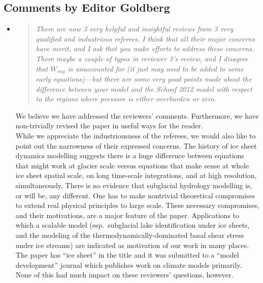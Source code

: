 \documentclass[11pt,reqno]{amsart}
\newcommand{\reply}[2]{
\medskip\medskip
\item  \begin{quote}
\emph{#1}
\end{quote}

\medskip
\noindent #2}
\begin{document}
\subsection*{Comments by Editor Goldberg}\begin{itemize}
\reply{There are now 3 very helpful and insightful reviews from 3 very qualified and industrious referees.  I think that all their major concerns have merit, and I ask that you make efforts to address these concerns.  There maybe a couple of typos in reviewer 3's review, and I disagree that $W_{eng}$ is unaccounted for (it just may need to be added to some early equations)---but there are some very good points made about the difference between your model and the Schoof 2012 model with respect to the regions where pressure is either overburden or zero.}
{We believe we have addressed the reviewers' comments.  Furthermore, we have non-trivially revised the paper in useful ways for the reader. \\
\indent While we appreciate the industriousness of the referees, we would also like to point out the narrowness of their expressed concerns.  The history of ice sheet dynamics modelling suggests there is a huge difference between equations that might work at glacier scale versus equations that make sense at whole ice sheet spatial scale, on long time-scale integrations, and at high resolution, simultaneously.  There is no evidence that subglacial hydrology modelling is, or will be, any different.  One has to make nontrivial theoretical compromises to extend real physical principles to large scale.  These necessary compromises, and their motivations, are a major feature of the paper.  Applications to which a scalable model (esp.~subglacial lake identification under ice sheets, and the modeling of the thermodynamically-dominated basal shear stress under ice streams) are indicated as motivation of our work in many places.  The paper has ``ice sheet'' in the title and it was submitted to a ``model development'' journal which publishes work on climate models primarily.  None of this had much impact on these reviewers' questions, however.}


\end{itemize}
\end{document}

